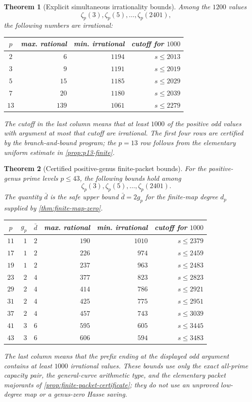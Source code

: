 \documentclass[11pt]{article}
\newtheorem{theorem}{Theorem}[section]
\theoremstyle{definition}
\theoremstyle{remark}
\begin{document}
\begin{theorem}[Explicit simultaneous irrationality bounds]
\label{thm:counts}
Among the $1200$ values
\[
 \zeta_p(3),\zeta_p(5),\ldots,\zeta_p(2401),
\]
the following numbers are irrational:
\begin{center}
\begin{tabular}{@{}crrr@{}}
\toprule
$p$&max. rational&min. irrational&cutoff for $1000$\\
\midrule
$2$&$6$&$1194$&$s\le2013$\\
$3$&$9$&$1191$&$s\le2019$\\
$5$&$15$&$1185$&$s\le2029$\\
$7$&$20$&$1180$&$s\le2039$\\
$13$&$139$&$1061$&$s\le2279$\\
\bottomrule
\end{tabular}
\end{center}
The cutoff in the last column means that at least $1000$ of the positive odd
values with argument at most that cutoff are irrational.  The first four rows
are certified by the branch-and-bound program; the $p=13$ row follows from
the elementary uniform estimate in \cref{prop:p13-finite}.
\end{theorem}

\begin{theorem}[Certified positive-genus finite-packet bounds]
\label{thm:positive-genus-counts}
For the positive-genus prime levels $p\le43$, the following bounds hold among
\[
 \zeta_p(3),\zeta_p(5),\ldots,\zeta_p(2401).
\]
The quantity $\bar d$ is the safe upper bound
$\bar d=2g_p$ for the finite-map degree $d_p$ supplied by
\cref{thm:finite-map-zero}.
\begin{center}
\begin{tabular}{@{}crrrrr@{}}
\toprule
$p$&$g_p$&$\bar d$&max. rational&min. irrational&cutoff for $1000$\\
\midrule
$11$&$1$&$2$&$190$&$1010$&$s\le2379$\\
$17$&$1$&$2$&$226$&$974$&$s\le2459$\\
$19$&$1$&$2$&$237$&$963$&$s\le2483$\\
$23$&$2$&$4$&$377$&$823$&$s\le2823$\\
$29$&$2$&$4$&$414$&$786$&$s\le2921$\\
$31$&$2$&$4$&$425$&$775$&$s\le2951$\\
$37$&$2$&$4$&$457$&$743$&$s\le3039$\\
$41$&$3$&$6$&$595$&$605$&$s\le3445$\\
$43$&$3$&$6$&$606$&$594$&$s\le3483$\\
\bottomrule
\end{tabular}
\end{center}
The last column means that the prefix ending at the displayed odd argument
contains at least $1000$ irrational values.  These bounds use only the exact
all-prime capacity pair, the general-curve arithmetic type, and the elementary
packet majorants of \cref{prop:finite-packet-certificate}; they do not use an
unproved low-degree map or a genus-zero Hasse saving.
\end{theorem}
\end{document}
